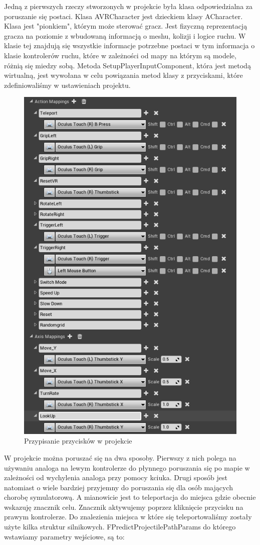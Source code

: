 \documentclass[a4paper,12pt,reqno]{article}
\begin{document}
Jedną z pierwszych rzeczy stworzonych w projekcie była klasa odpowiedzialna za poruszanie się postaci. Klasa AVRCharacter jest dzieckiem klasy ACharacter. Klasa jest "pionkiem", którym może sterować gracz. Jest fizyczną reprezentacją gracza na poziomie z wbudowaną informacją o meshu, kolizji i logice ruchu. W klasie tej znajdują się wszystkie informacje potrzebne postaci w tym informacja o klasie kontrolerów ruchu, które w zależności od mapy na którym są modele, różnią się miedzy sobą. Metoda SetupPlayerInputComponent, która jest metodą wirtualną, jest wywołana w celu powiązania metod klasy z przyciskami, które zdefiniowaliśmy w ustawieniach projektu. 




\begin{figure}[H]%
\centering
\includegraphics[width=0.4\linewidth]{graphics/05/InputMappingUE4.png}
\caption{Przypisanie przycisków w projekcie }	
\label{ref:InputMappingUE4}
\end{figure}%

W projekcie można poruszać się na dwa sposoby. Pierwszy z nich polega na używaniu 
analoga na lewym kontrolerze do płynnego poruszania się po mapie w zależności od wychylenia analoga przy pomocy kciuka. Drugi sposób jest natomiast o wiele bardziej przyjemny do poruszania się dla osób mających chorobę symulatorową. A mianowicie jest to teleportacja do miejsca gdzie obecnie wskazuję znacznik celu. Znacznik aktywujemy poprzez kliknięcie przycisku na prawym kontrolerze. Do znalezienia miejsca w które się teleportowaliśmy zostały użyte kilka struktur silnikowych. FPredictProjectilePathParams do którego wstawiamy parametry wejściowe, są to:
\end{document}
